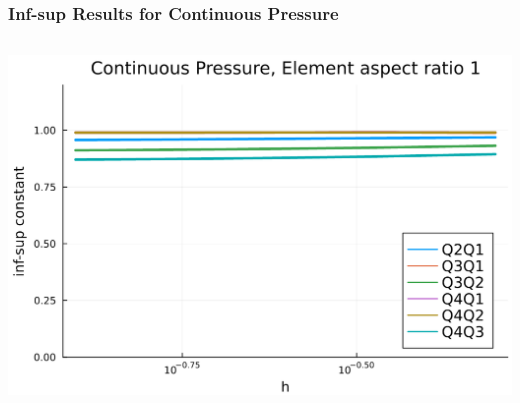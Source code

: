 \documentclass[aspectratio=169,xcolor=dvipsnames]{beamer}
\begin{document}

\begin{frame}
    \frametitle{Inf-sup Results for Continuous Pressure}
    \begin{columns}
        \centering
        \includegraphics[height =0.6\textheight]{figures/cont-p-1.png}
    \end{columns}

\end{frame}

\end{document}
